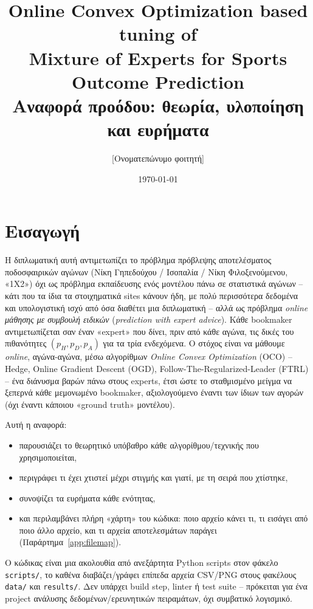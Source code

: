 \documentclass[11pt,a4paper]{article}
\title{\textbf{Online Convex Optimization based tuning of\\ Mixture of Experts for Sports Outcome Prediction}\\[6pt]
\large Αναφορά προόδου: θεωρία, υλοποίηση και ευρήματα}
\author{[Ονοματεπώνυμο φοιτητή]}
\date{\today}
\newcommand{\file}[1]{\texttt{#1}}
\renewcommand{\_}{\oldunderscore\allowbreak}
\begin{document}
\maketitle
\tableofcontents
\newpage

\section{Εισαγωγή}

Η διπλωματική αυτή αντιμετωπίζει το πρόβλημα πρόβλεψης αποτελέσματος ποδοσφαιρικών
αγώνων (Νίκη Γηπεδούχου / Ισοπαλία / Νίκη Φιλοξενούμενου, «1X2») όχι ως πρόβλημα
εκπαίδευσης ενός μοντέλου πάνω σε στατιστικά αγώνων -- κάτι που τα ίδια τα στοιχηματικά
sites κάνουν ήδη, με πολύ περισσότερα δεδομένα και υπολογιστική ισχύ από όσα διαθέτει μια
διπλωματική -- αλλά ως πρόβλημα \emph{online μάθησης με συμβουλή ειδικών} (\emph{prediction
with expert advice}). Κάθε bookmaker αντιμετωπίζεται σαν έναν «expert» που δίνει, πριν από
κάθε αγώνα, τις δικές του πιθανότητες $(p_H, p_D, p_A)$ για τα τρία ενδεχόμενα. Ο στόχος
είναι να μάθουμε \emph{online}, αγώνα-αγώνα, μέσω αλγορίθμων \emph{Online Convex
Optimization} (OCO) -- Hedge, Online Gradient Descent (OGD), Follow-The-Regularized-Leader
(FTRL) -- ένα διάνυσμα βαρών πάνω στους experts, έτσι ώστε το σταθμισμένο μείγμα να
ξεπερνά κάθε μεμονωμένο bookmaker, αξιολογούμενο έναντι των ίδιων των αγορών (όχι έναντι
κάποιου «ground truth» μοντέλου).

Αυτή η αναφορά:
\begin{itemize}
  \item παρουσιάζει το θεωρητικό υπόβαθρο κάθε αλγορίθμου/τεχνικής που χρησιμοποιείται,
  \item περιγράφει τι έχει χτιστεί μέχρι στιγμής και γιατί, με τη σειρά που χτίστηκε,
  \item συνοψίζει τα ευρήματα κάθε ενότητας,
  \item και περιλαμβάνει πλήρη «χάρτη» του κώδικα: ποιο αρχείο κάνει τι, τι εισάγει από
        ποιο άλλο αρχείο, και τι αρχεία αποτελεσμάτων παράγει (Παράρτημα~\ref{app:filemap}).
\end{itemize}

Ο κώδικας είναι μια ακολουθία από ανεξάρτητα Python scripts στον φάκελο \file{scripts/},
το καθένα διαβάζει/γράφει επίπεδα αρχεία CSV/PNG στους φακέλους \file{data/} και
\file{results/}. Δεν υπάρχει build step, linter ή test suite -- πρόκειται για ένα project
ανάλυσης δεδομένων/ερευνητικών πειραμάτων, όχι συμβατικό λογισμικό.
\end{document}
